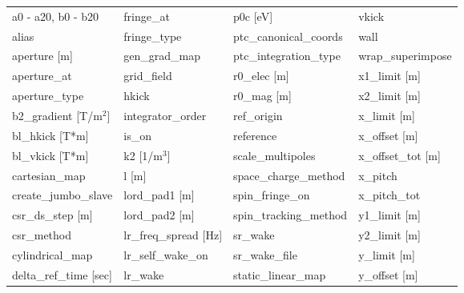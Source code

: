  \begin{tabular}{llll} \toprule
a0 - a20, b0 - b20               & fringe_at                        & p0c [eV]                         & vkick                            \\
alias                            & fringe_type                      & ptc_canonical_coords             & wall                             \\
aperture [m]                     & gen_grad_map                     & ptc_integration_type             & wrap_superimpose                 \\
aperture_at                      & grid_field                       & r0_elec [m]                      & x1_limit [m]                     \\
aperture_type                    & hkick                            & r0_mag [m]                       & x2_limit [m]                     \\
b2_gradient [T/m$^2$]            & integrator_order                 & ref_origin                       & x_limit [m]                      \\
bl_hkick [T*m]                   & is_on                            & reference                        & x_offset [m]                     \\
bl_vkick [T*m]                   & k2 [1/m$^3$]                     & scale_multipoles                 & x_offset_tot [m]                 \\
cartesian_map                    & l [m]                            & space_charge_method              & x_pitch                          \\
create_jumbo_slave               & lord_pad1 [m]                    & spin_fringe_on                   & x_pitch_tot                      \\
csr_ds_step [m]                  & lord_pad2 [m]                    & spin_tracking_method             & y1_limit [m]                     \\
csr_method                       & lr_freq_spread [Hz]              & sr_wake                          & y2_limit [m]                     \\
cylindrical_map                  & lr_self_wake_on                  & sr_wake_file                     & y_limit [m]                      \\
delta_ref_time [sec]             & lr_wake                          & static_linear_map                & y_offset [m]                     \\

\end{tabular}
